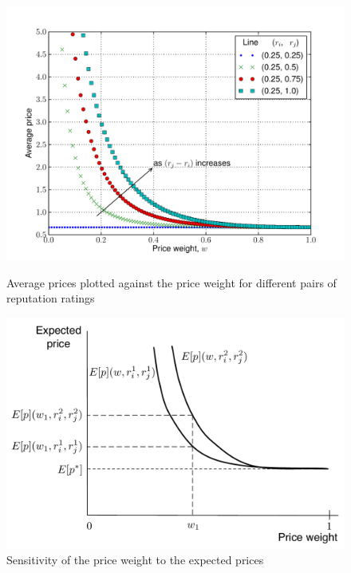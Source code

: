 \begin{figure}[p!]
  \includegraphics[width=\figsize]{Indirect/Figures/expected_prices}
  \caption{Average prices plotted against the price weight for different pairs of reputation ratings}
  \label{fig:expected_prices_indirect}
  \vspace{10mm}
  \includegraphics[width=\figsize]{Indirect/Figures/expected_prices_sensitivity}
  \caption{Sensitivity of the price weight to the expected prices}
  \label{fig:expected_prices_sensitivity_indirect}
\end{figure}

